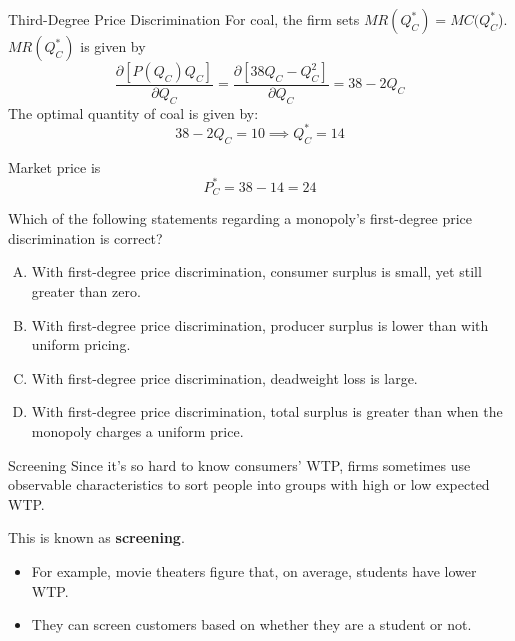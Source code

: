 \documentclass[11pt,t]{beamer}
\begin{document}
\begin{frame}{Third-Degree Price Discrimination}
  For coal, the firm sets $MR(Q_C^*) = MC(Q_C^*$). $MR(Q_C^*)$ is given by
  $$
    \frac{\partial [P(Q_C) Q_C]}{\partial Q_C}= \frac{\partial [38Q_C - Q_C^2]}{\partial Q_C} =38-2Q_C
  $$
  The optimal quantity of coal is given by:
  $$
    38 - 2Q_C = 10 \implies Q_C^* = 14
  $$
  
  Market price is
  $$
    P_C^* = 38 - 14 = 24
  $$
\end{frame}

\begin{frame}{}
  Which of the following statements regarding a monopoly's first-degree price discrimination is correct?

  \begin{enumerate}[A)]
    \item With first-degree price discrimination, consumer surplus is small, yet still greater than zero.
    \item With first-degree price discrimination, producer surplus is lower than with uniform pricing.
    \item With first-degree price discrimination, deadweight loss is large.
    \item With first-degree price discrimination, total surplus is greater than when the monopoly charges a uniform price.
  \end{enumerate}
\end{frame}


\begin{frame}{Screening}
  Since it's so hard to know consumers' WTP, firms sometimes use observable characteristics to sort people into groups with high or low expected WTP.
  
  This is known as \textbf{screening}.

  \begin{itemize}
    \item For example, movie theaters figure that, on average, students have lower WTP.
    \item They can screen customers based on whether they are a student or not.
  \end{itemize}
\end{frame}
\end{document}
